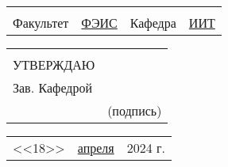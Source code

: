 \documentclass[12pt, А4, twoside]{article} %
\begin{document}
	\begin{flushleft} %
		\fontsize{12}{15} %
		
		\begin{tabular}{p{1.8cm} p{6.2cm} p{2.0cm} p{6.0cm}} 
			& & & %
			\\ %
			\textsf{Факультет} & 
			\uline{\centering \hspace{2.4cm} \textsf{ ФЭИС } \hspace{2.4cm}\vspace{1pt}}  &
			\textsf{Кафедра} &
			\uline{\centering \hspace{2.4cm} \textsf{ ИИТ } \hspace{2.4cm}\vspace{1pt}} 
		\end{tabular} 
		
		\begin{tabular}{p{2.5cm} p{5.5cm}} 
			& \\ 
			\textsf{УТВЕРЖДАЮ} & \\
			\textsf{Зав. Кафедрой} & \uline{\hspace{5.8cm}}\vspace{1pt}  \\ 
			\hspace{2.8cm} &  \centering \textsf{(подпись)} 
		\end{tabular} 
		
		\begin{tabular}{p{1.0cm} p{5.0cm} p{2.0cm}} 
			\textsf{<<18>>} & 
			\centering \uline{ \hspace{1.7cm} \textsf{апреля} \hspace{1.7cm} }\vspace{1pt}  &
			\textsf{2024 г.} \\
		\end{tabular}
		
	\end{flushleft} %
	
\end{document}
